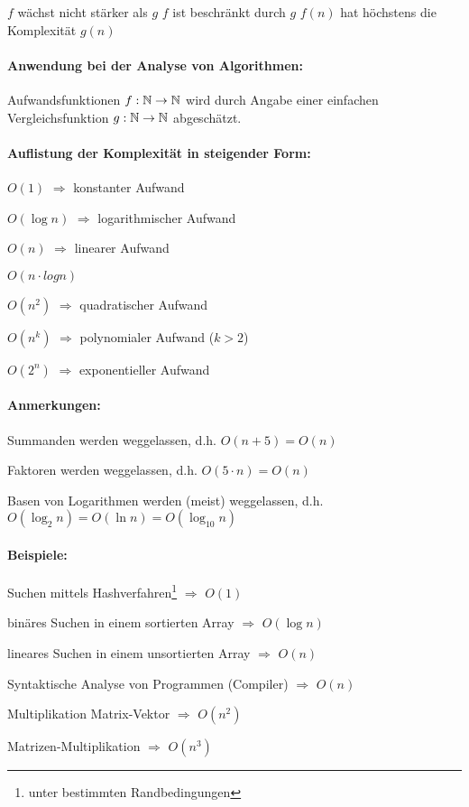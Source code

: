 {\flqq $f$ wächst nicht stärker als $g$\frqq}
{\flqq $f$ ist beschränkt durch $g$\frqq}
{\flqq $f(n)$ hat höchstens die Komplexität $g(n)$\frqq}

\paragraph{Anwendung bei der Analyse von Algorithmen:} Aufwandsfunktionen $f : \mathbb{N} \to \mathbb{N}$ wird durch Angabe einer einfachen Vergleichsfunktion $g : \mathbb{N} \to \mathbb{N}$ abgeschätzt.

\paragraph{Auflistung der Komplexität in steigender Form:}
\begin{compactitem}
	\item $O(1)$ $\Rightarrow$ konstanter Aufwand
	\item $O(\log n)$ $\Rightarrow$ logarithmischer Aufwand
	\item $O(n)$ $\Rightarrow$ linearer Aufwand
	\item $O(n \cdot log n)$
	\item $O(n^2)$ $\Rightarrow$ quadratischer Aufwand
	\item $O(n^k)$ $\Rightarrow$ polynomialer Aufwand ($k>2$)
	\item $O(2^n)$ $\Rightarrow$ exponentieller Aufwand
\end{compactitem}

\paragraph{Anmerkungen:}
\begin{compactitem}
	\item Summanden werden weggelassen, d.h. $O(n+5) = O(n)$
	\item Faktoren werden weggelassen, d.h. $O(5\cdot n) = O(n)$
	\item Basen von Logarithmen werden (meist) weggelassen, d.h. $O(\log_2 n) = O(\ln n) = O(\log_{10} n)$
\end{compactitem}

\paragraph{Beispiele:}
\begin{compactitem}
	\item Suchen mittels Hashverfahren\footnote{unter bestimmten Randbedingungen} $\Rightarrow$ $O(1)$
	\item binäres Suchen in einem sortierten Array $\Rightarrow$ $O(\log n)$
	\item lineares Suchen in einem unsortierten Array $\Rightarrow$ $O(n)$
	\item Syntaktische Analyse von Programmen (Compiler) $\Rightarrow$ $O(n)$
	\item Multiplikation Matrix-Vektor $\Rightarrow$ $O(n^2)$
	\item Matrizen-Multiplikation $\Rightarrow$ $O(n^3)$
\end{compactitem}

